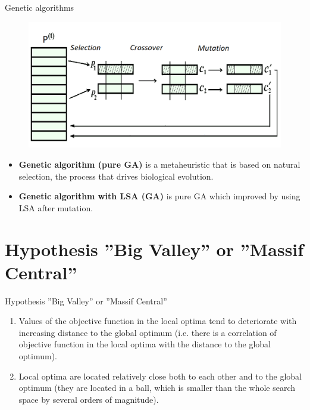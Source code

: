 \documentclass[aspectratio=169,xcolor=dvipsnames]{beamer}
\begin{document}

\begin{frame}{Genetic algorithms}
    \begin{figure}
    \includegraphics[scale=0.4]{schGA}
    \end{figure}
\begin{itemize}
\item \textbf{Genetic algorithm (pure GA)} is a metaheuristic that is based on natural selection, the process that drives biological evolution.
\item \textbf{Genetic algorithm with LSA (GA)} is pure GA which improved by using LSA after mutation.
\end{itemize}
    
\end{frame}

\section{Hypothesis ''Big Valley'' or ''Massif Central''}

\begin{frame}{Hypothesis ''Big Valley'' or ''Massif Central''}
\begin{enumerate}
\item Values of the objective function in the local optima tend to deteriorate with increasing distance to the global optimum (i.e. there is a correlation 
of objective function in the local optima with the distance to the global optimum).
\vspace{0.5cm}	
\item Local optima are located relatively close both to each other and to the global optimum (they are located in a ball, which is smaller than 
the whole search space by several orders of magnitude).
\end{enumerate}
\end{frame}
\end{document}
